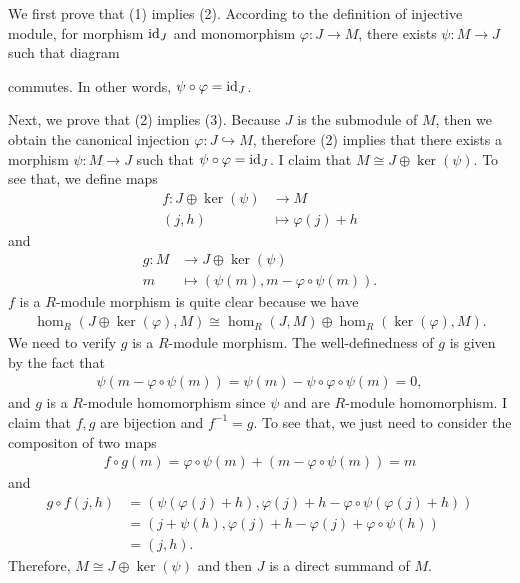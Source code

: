\begin{solution}
    We first prove that (1) implies (2). According to the definition of injective module, for morphism $\operatorname{id}_J$ and monomorphism $\varphi:J\to M$, there exists $\psi:M\to J$ such that diagram
    
    \begin{center}
    \end{center}
commutes. In other words, $\psi\circ\varphi = \operatorname{id}_J$.

Next, we prove that (2) implies (3). Because $J$ is the submodule of $M$, then we obtain the canonical injection $\varphi:J\hookrightarrow M$, therefore (2) implies that there exists a morphism $\psi:M\to J$ such that $\psi\circ\varphi = \operatorname{id}_J$.
I claim that $M\cong J\oplus\ker(\psi)$. To see that, we define maps 
\begin{align*}
    f:J\oplus \ker(\psi) &\to M \\ (j,h) &\mapsto \varphi(j)+h 
\end{align*}
and 
\begin{align*}
        g:M &\to J\oplus \ker(\psi)  \\ m  &\mapsto (\psi(m),m-\varphi\circ\psi(m)).
\end{align*}
$f$ is a $R$-module morphism is quite clear because we have 
\begin{align*}
    \hom_R(J\oplus\ker(\varphi),M)\cong \hom_R(J,M) \oplus \hom_R(\ker(\varphi),M).
\end{align*}
We need to verify $g$ is a $R$-module morphism. The well-definedness of $g$ is given by the fact that 
\begin{align*}
    \psi(m-\varphi\circ\psi(m))=\psi(m) - \psi\circ \varphi\circ\psi(m)= 0,
\end{align*}
and $g$ is a $R$-module homomorphism since $\psi$ and are $R$-module homomorphism. I claim that $f,g$ are bijection and $f^{-1}=g$.
To see that, we just need to consider the compositon of two maps
\begin{align*}
    f\circ g(m)=\varphi\circ \psi(m)+(m-\varphi\circ \psi(m)) =m
\end{align*}
and 
\begin{align*}
    g\circ f(j,h) &= (\psi(\varphi(j)+h),\varphi(j)+h-\varphi\circ\psi(\varphi(j)+h)) \\
    &= (j+\psi(h),\varphi(j)+h-\varphi(j)+\varphi\circ\psi(h)) \\
    &=(j,h).
\end{align*}
Therefore, $M\cong J\oplus \ker(\psi)$ and then $J$ is a direct summand of $M$.


\end{solution}
